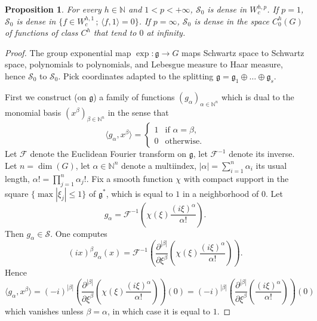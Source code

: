 \documentclass[11pt]{article}
\newtheorem{prop}[theo]{Proposition}
\theoremstyle{definition}
\numberwithin{equation}{section}
\numberwithin{figure}{section}
\numberwithin{table}{section}
\newcommand{\N}{\mathbb{N}}
\newcommand*\calS{\mathcal{S}}
\newcommand*\F{\mathcal{F}}
\newcommand*\Fi{\mathcal{F}^{-1}}
\begin{document}
\begin{prop}\label{prop:density-s_0}
For every $h\in\N$ and $1<p<+\infty$, $\calS_0$ is dense in $W^{h,p}_c$. If $p=1$, $\calS_0$ is dense in $\{f\in W_c^{h,1}\,;\,\langle f,1 \rangle=0\}$. If $p=\infty$, $\calS_0$ is dense in the space $C^h_0(G)$ of functions of class $C^h$ that tend to $0$ at infinity.
\end{prop}

\begin{proof}
The group exponential map $\exp:\mathfrak{g}\to G$ maps Schwartz space to Schwartz space, polynomials to polynomials, and Lebesgue measure to Haar measure, hence $\calS_0$ to $\calS_0$. Pick coordinates adapted to the splitting $\mathfrak{g}=\mathfrak{g}_1\oplus\dots\oplus\mathfrak{g}_s$.

First we construct (on $\mathfrak{g}$) a family of functions $(g_\alpha)_{\alpha\in\N^n}$ which is dual to the monomial basis $(x^\beta)_{\beta\in\N^n}$ in the sense that
\[
\langle g_\alpha,x^\beta\rangle=
\begin{cases}
1 & \text{if }\alpha=\beta, \\
0 & \text{otherwise}.
\end{cases}
\]
Let $\F$ denote the Euclidean Fourier transform on $\mathfrak{g}$, let $\Fi$ denote its inverse. Let $n=\dim(G)$, let $\alpha\in\N^n$ denote a multiindex, $|\alpha|=\sum_{i=1}^n \alpha_i$ its usual length, $\alpha!=\prod_{j=1}^n \alpha_j!$. Fix a smooth function $\chi$ with compact support in the square $\{\max |\xi_j| \leq 1\}$ of $\mathfrak{g}^*$, which is equal to $1$ in a neighborhood of $0$. Let
\[
g_\alpha=\Fi\left(\chi(\xi)\frac{(i\xi)^{\alpha}}{\alpha!}\right).
\]
Then $g_\alpha\in\calS$. One computes
\[
(ix)^\beta g_\alpha(x)= \Fi\left(\frac{\partial^{|\beta|}}{\partial\xi^{\beta}} \left(\chi(\xi) \frac{(i\xi)^\alpha}{\alpha!}\right)\right).
\]
Hence
\[
\langle g_\alpha,x^\beta\rangle=(-i)^{|\beta|}\left(\frac{\partial^{|\beta|}}{\partial\xi^{\beta}} \left(\chi(\xi)\frac{(i\xi)^\alpha}{\alpha!}\right) \right)(0) = (-i)^{|\beta|}\left(\frac{\partial^{|\beta|}}{\partial\xi^{\beta}} \left(\frac{(i\xi)^\alpha}{\alpha!}\right)\right)(0)
\]
which vanishes unless $\beta=\alpha$, in which case it is equal to $1$.


\end{proof}
\end{document}
